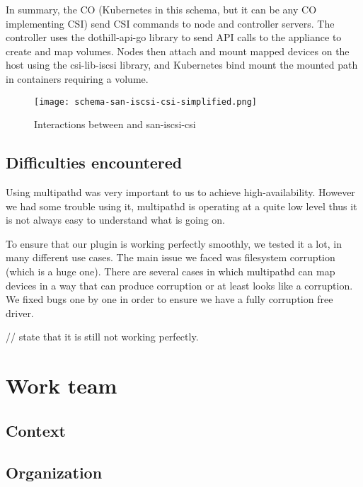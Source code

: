 \color{darkgreen}
In summary, the CO (Kubernetes in this schema, but it can be any CO implementing CSI) send CSI commands to node and controller servers. The controller uses the dothill-api-go library to send API calls to the appliance to create and map volumes. Nodes then attach and mount mapped devices on the host using the csi-lib-iscsi library, and Kubernetes bind mount the mounted path in containers requiring a volume.
\color{black}

\begin{figure}[h]
    \centering
    \texttt{[image: schema-san-iscsi-csi-simplified.png]}
    \caption{Interactions between  and \gls{san-iscsi-csi}}
    \label{fig:k8s-san-scsi-csi}
\end{figure}

\subsection{Difficulties encountered}

\color{darkgreen}
Using multipathd was very important to us to achieve high-availability. However we had some trouble using it, multipathd is operating at a quite low level thus it is not always easy to understand what is going on.

To ensure that our plugin is working perfectly smoothly, we tested it a lot, in many different use cases. The main issue we faced was filesystem corruption (which is a huge one). There are several cases in which multipathd can map devices in a way that can produce corruption or at least looks like a corruption. We fixed bugs one by one in order to ensure we have a fully corruption free driver.

// state that it is still not working perfectly.
\color{black}

\section{Work team}

\subsection{Context}

\subsection{Organization}

\clearpage
